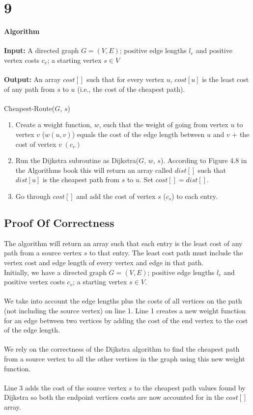 \documentclass[12pt]{article}
\begin{document}
\section*{9}
{\selectfont
\textbf{Algorithm}\\
\\
\textbf{Input:} A directed graph $G=(V,E)$; positive edge lengths $l_e$ and positive vertex costs $c_v$; a starting vertex $s \in V$\\
\\
\textbf{Output:} An array $cost[]$ such that for every vertex $u$, $cost[u]$ is the least cost of any path from $s$ to $u$ (i.e., the cost of the cheapest path).\\
\\
Cheapest-Route($G$, $s$)\\
\begin{enumerate}
\item Create a weight function, $w$, such that the weight of going from vertex $u$ to vertex $v$ ($w(u,v)$) equals the cost of the edge length between $u$ and $v$ + the cost of vertex $v\;(c_v)$
\item Run the Dijkstra subroutine as Dijkstra($G$, $w$, $s$).  According to Figure 4.8 in the Algorithms book this will return an array called $dist[]$ such that $dist[u]$ is the cheapest path from $s$ to $u$.  Set $cost[] = dist[]$.
\item Go through $cost[]$ and add the cost of vertex $s$ ($c_s$) to each entry. 
\end{enumerate}
}

\subsection*{Proof Of Correctness}
The algorithm will return an array such that each entry is the least cost of any path from a source vertex $s$ to that entry.  The least cost path must include the vertex cost and edge length of every vertex and edge in that path.\\
Initially, we have a directed graph $G=(V,E)$; positive edge lengths $l_e$ and positive vertex costs $c_v$; a starting vertex $s \in V$.\\
\\
We take into account the edge lengths plus the costs of all vertices on the path (not including the source vertex) on line 1.  Line 1 creates a new weight function for an edge between two vertices by adding the cost of the end vertex to the cost of the edge length.\\  
\\
We rely on the correctness of the Dijkstra algorithm to find the cheapest path from a source vertex to all the other vertices in the graph using this new weight function.\\
\\
Line 3 adds the cost of the source vertex $s$ to the cheapest path values found by Dijkstra so both the endpoint vertices costs are now accounted for in the $cost[]$ array.\\
\end{document}
